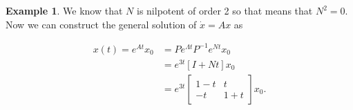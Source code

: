 \documentclass[12pt]{article}
\theoremstyle{definition}
\newtheorem*{example}{Example}
\begin{document}
\begin{example}
We know that $N$ is nilpotent of order 2 so that means that $N^2 = 0$. Now we can construct the 
general solution of $\dot x = Ax$ as

\begin{equation*}
\begin{split}
x(t) = e^{At}x_0 &= P e^{\Lambda t} P^{-1} e^{Nt} x_0 \\
&= e^{3t} [I + Nt] x_0 \\
&= e^{3t}
\begin{bmatrix}
1 - t & t \\
-t & 1 + t
\end{bmatrix}
x_0.
\end{split}
\end{equation*}

\end{example}
\end{document}
